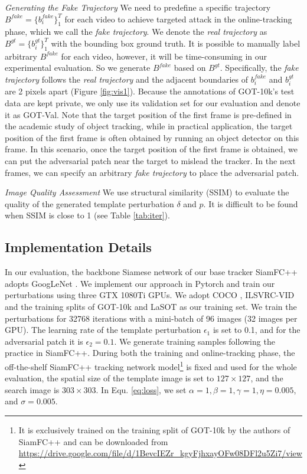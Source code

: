 \documentclass[journal]{IEEEtran}
\begin{document}
\textit{Generating the Fake Trajectory} We need to predefine a specific trajectory $B^{fake}=\{b^{fake}_i\}_1^{T}$ for each video to achieve targeted attack in the online-tracking phase, which we call the \textit{fake trajectory}. We denote the \textit{real trajectory} as $B^{gt}=\{b^{gt}_i\}_1^T$ with the bounding box ground truth.
It is possible to manually label arbitrary $B^{fake}$ for each video, however, it will be time-consuming in our experimental evaluation. So we generate $B^{fake}$ based on $B^{gt}$. Specifically, the \textit{fake trajectory} follows the \textit{real trajectory} and the adjacent boundaries of $b^{fake}_i$ and $b^{gt}_i$ are 2 pixels apart (Figure \ref{fig:vis1}).
Because the annotations of GOT-10k's test data are kept private, we only use its validation set for our evaluation and denote it as GOT-Val. Note that the target position of the first frame is pre-defined in the academic study of object tracking, while in practical application, the target position of the first frame is often obtained by running an object detector on this frame. In this scenario, once the target position of the first frame is obtained, we can put the adversarial patch near the target to mislead the tracker. In the next frames, we can specify an arbitrary \textit{fake trajectory} to place the adversarial patch.

\textit{Image Quality Assessment} We use structural similarity (SSIM) \cite{SSIM} to evaluate the quality of the generated template perturbation $\delta$ and $p$. It is difficult to be found when SSIM is close to 1 (see Table \ref{tab:iter}).

\subsection{Implementation Details}

In our evaluation, the backbone Siamese network of our base tracker SiamFC++ \cite{SiamFC++} adopts GoogLeNet \cite{GoogLeNet}.
We implement our approach in Pytorch and train our perturbations using three GTX 1080Ti GPUs.
We adopt COCO \cite{COCO}, ILSVRC-VID \cite{VID} and the training splits of GOT-10k \cite{GOT-10k} and LaSOT \cite{LaSOT} as our training set.
We train the perturbations for 32768 iterations with a mini-batch of 96 images (32 images per GPU).
The learning rate of the template perturbation $\epsilon_1$ is set to 0.1, and for the adversarial patch it is $\epsilon_2 = 0.1$.
We generate training samples following the practice in SiamFC++.
During both the training and online-tracking phase, the off-the-shelf SiamFC++ tracking network model\footnote{It is exclusively trained on the training split of GOT-10k by the authors of SiamFC++ and can be downloaded from \url{https://drive.google.com/file/d/1BevcIEZr_kgyFjhxayOFw08DFl2u5Zi7/view}} is fixed and used for the whole evaluation, the spatial size of the template image is set to $127\times 127$, and the search image is $303\times 303$.
In Equ. \ref{eq:loss}, we set $\alpha=1, \beta=1, \gamma=1, \eta=0.005$, and $\sigma=0.005$.
\end{document}
